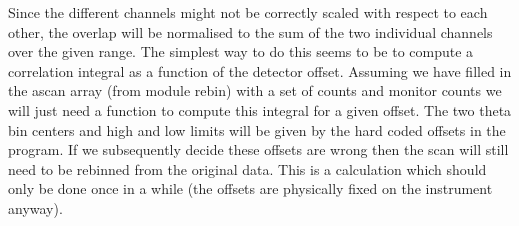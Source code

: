 \documentclass[10pt,a4paper,notitlepage]{article}
\begin{document}
Since the different channels might not be correctly scaled with respect to 
each other, the overlap will be normalised to the sum of the two individual 
channels over the given range.
The simplest way to do this seems to be to compute a correlation integral 
as a function of the detector offset. 
Assuming we have filled in the ascan array (from module rebin) with a set of 
counts and monitor counts we will just need a function to compute this 
integral for a given offset. 
The two theta bin centers and high and low limits will be given by the hard 
coded offsets in the program. 
If we subsequently decide these offsets are wrong then the scan will still 
need to be rebinned from the original data. 
This is a calculation which should only be done once in a while (the offsets 
are physically fixed on the instrument anyway).
\end{document}
